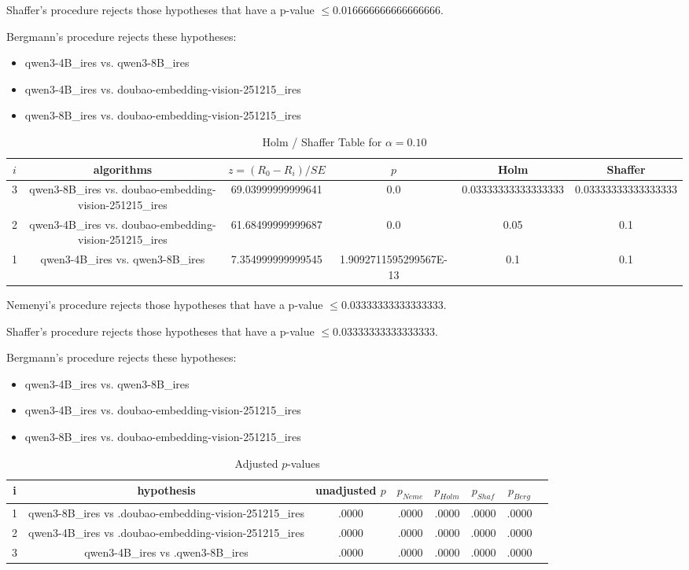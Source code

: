 \documentclass[a4paper,10pt]{article}
\begin{document}
\begin{landscape}
Shaffer's procedure rejects those hypotheses that have a p-value $\le0.016666666666666666$.


Bergmann's procedure rejects these hypotheses:


\begin{itemize}


\item qwen3-4B_ires vs. qwen3-8B_ires\item qwen3-4B_ires vs. doubao-embedding-vision-251215_ires\item qwen3-8B_ires vs. doubao-embedding-vision-251215_ires\end{itemize}


\begin{table}[!htp]
\centering\tiny
\caption{Holm / Shaffer Table for $\alpha=0.10$}
\begin{tabular}{cccccc}
$i$&algorithms&$z=(R_0 - R_i)/SE$&$p$&Holm&Shaffer\\
\hline
3&qwen3-8B_ires vs. doubao-embedding-vision-251215_ires&69.03999999999641&0.0&0.03333333333333333&0.03333333333333333\\2&qwen3-4B_ires vs. doubao-embedding-vision-251215_ires&61.68499999999687&0.0&0.05&0.1\\1&qwen3-4B_ires vs. qwen3-8B_ires&7.354999999999545&1.9092711595299567E-13&0.1&0.1\\\hline
\end{tabular}
\end{table}
Nemenyi's procedure rejects those hypotheses that have a p-value $\le0.03333333333333333$.


Shaffer's procedure rejects those hypotheses that have a p-value $\le0.03333333333333333$.


Bergmann's procedure rejects these hypotheses:


\begin{itemize}


\item qwen3-4B_ires vs. qwen3-8B_ires
\item qwen3-4B_ires vs. doubao-embedding-vision-251215_ires
\item qwen3-8B_ires vs. doubao-embedding-vision-251215_ires
\end{itemize}


\begin{table}[!htp]
\centering\tiny
\caption{Adjusted $p$-values}
\begin{tabular}{cccccccc}
i&hypothesis&unadjusted $p$&$p_{Neme}$&$p_{Holm}$&$p_{Shaf}$&$p_{Berg}$\\
\hline
1&qwen3-8B_ires vs .doubao-embedding-vision-251215_ires&.0000&.0000&.0000&.0000&.0000\\2&qwen3-4B_ires vs .doubao-embedding-vision-251215_ires&.0000&.0000&.0000&.0000&.0000\\3&qwen3-4B_ires vs .qwen3-8B_ires&.0000&.0000&.0000&.0000&.0000\\\hline
\end{tabular}
\end{table}

\end{landscape}
\end{document}

